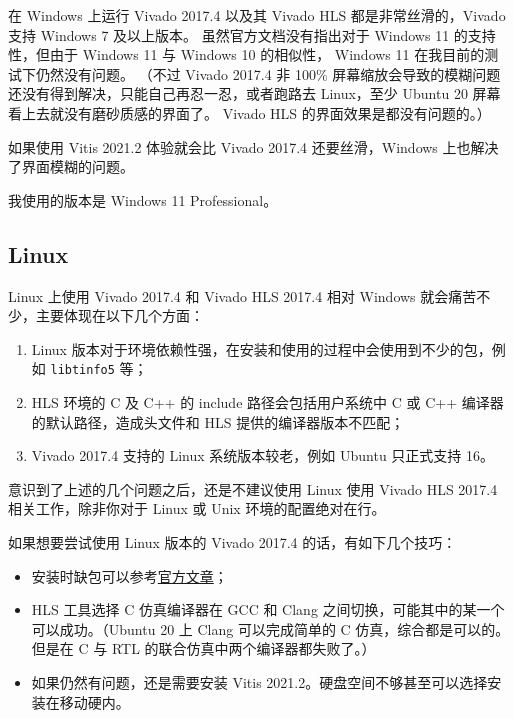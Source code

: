\documentclass[Chinese,TC,use boldface,simple name]{beaulivre}
\newenvironment{tip}[1][提示]{%
    \begin{tcolorbox}[breakable,
        enhanced,
        width = \textwidth,
        colback = paper, colbacktitle = paper,
        colframe = gray!50, boxrule=0.2mm,
        coltitle = black,
        fonttitle = \sffamily,
        attach boxed title to top left = {yshift=-\tcboxedtitleheight/2, xshift=.5cm},
        boxed title style = {boxrule=0pt, colframe=paper},
        before skip = 0.3cm,
        after skip = 0.3cm,
        top = 3mm,
        bottom = 3mm,
        title={\scshape\sffamily #1}]%
}{\end{tcolorbox}}
\begin{document}
      在 Windows 上运行 Vivado 2017.4 以及其 Vivado HLS 都是非常丝滑的，Vivado 支持 Windows 7 及以上版本。
      虽然官方文档没有指出对于 Windows 11 的支持性，但由于 Windows 11 与 Windows 10 的相似性，
      Windows 11 在我目前的测试下仍然没有问题。
      （不过 Vivado 2017.4 非 100\% 屏幕缩放会导致的模糊问题还没有得到解决，只能自己再忍一忍，或者跑路去 Linux，至少 Ubuntu 20 屏幕看上去就没有磨砂质感的界面了。
      Vivado HLS 的界面效果是都没有问题的。）

      如果使用 Vitis 2021.2 体验就会比 Vivado 2017.4 还要丝滑，Windows 上也解决了界面模糊的问题。

      \begin{tip}
        我使用的版本是 Windows 11 Professional。
      \end{tip}

    \subsection{Linux}

      Linux 上使用 Vivado 2017.4 和 Vivado HLS 2017.4 相对 Windows 就会痛苦不少，主要体现在以下几个方面：
      \begin{enumerate}
        \item Linux 版本对于环境依赖性强，在安装和使用的过程中会使用到不少的包，例如 \texttt{libtinfo5} 等；
        \item HLS 环境的 C 及 C++ 的 include 路径会包括用户系统中 C 或 C++ 编译器的默认路径，造成头文件和 HLS 提供的编译器版本不匹配；
        \item Vivado 2017.4 支持的 Linux 系统版本较老，例如 Ubuntu 只正式支持 16。
      \end{enumerate}

      \begin{warning}
        意识到了上述的几个问题之后，还是不建议使用 Linux 使用 Vivado HLS 2017.4 相关工作，除非你对于 Linux 或 Unix 环境的配置绝对在行。
      \end{warning}

      如果想要尝试使用 Linux 版本的 Vivado 2017.4 的话，有如下几个技巧：
      \begin{itemize}
        \item 安装时缺包可以参考\href{https://support.xilinx.com/s/article/63794?language=en_US}{官方文章}；
        \item HLS 工具选择 C 仿真编译器在 GCC 和 Clang 之间切换，可能其中的某一个可以成功。（Ubuntu 20 上 Clang 可以完成简单的 C 仿真，综合都是可以的。但是在 C 与 RTL 的联合仿真中两个编译器都失败了。）
        \item 如果仍然有问题，还是需要安装 Vitis 2021.2。硬盘空间不够甚至可以选择安装在移动硬内。
      \end{itemize}
\end{document}

